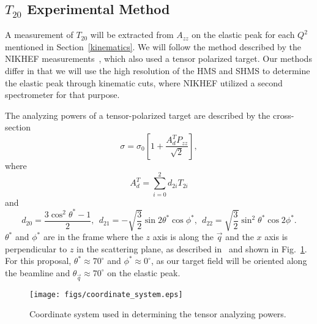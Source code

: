 \subsection{$T_{20}$ Experimental Method} %
\label{t20_exp}

A measurement of $T_{20}$ will be extracted from $A_{zz}$ on the elastic peak for each $Q^2$ mentioned in Section~\ref{kinematics}. We will follow the method described by the NIKHEF measurements~\cite{Bouwhuis:1998re}, which also used a tensor polarized target. Our methods differ in that we will use the high resolution of the HMS and SHMS to determine the elastic peak through kinematic cuts, where NIKHEF utilized a second spectrometer for that purpose. 

The analyzing powers of a tensor-polarized target are described by the cross-section
\begin{equation}
\sigma = \sigma_0\left[ 1 + \frac{A_d^T P_{zz}}{\sqrt{2}} \right],
\label{cs-ana}
\end{equation}
where
\begin{equation} A^T_d = \sum_{i=0}^{2}d_{2i}T_{2i}
\end{equation}
and
\begin{equation} d_{20} = \frac{3 \cos^2 \theta^* -1}{2},~~d_{21} = -\sqrt{\frac{3}{2}}\sin2\theta^*\cos\phi^*,~~d_{22}=\sqrt{\frac{3}{2}}\sin^2\theta^*\cos 2\phi^*.
\end{equation}
$\theta^*$ and $\phi^*$ are in the frame where the $z$ axis is along the $\vec{q}$ and the $x$ axis is perpendicular to $z$ in the scattering plane, as described in~\cite{Donnelly:1985ry} and shown in Fig.~\ref{coords}. For this proposal, $\theta^* \approx 70^{\circ}$ and $\phi^* \approx 0^{\circ}$, as our target field will be oriented along the beamline and $\theta_{\vec{q}}\approx 70^{\circ}$ on the elastic peak.

\begin{figure}
\begin{center}
\texttt{[image: figs/coordinate\_system.eps]} 
\caption{\label{coords}Coordinate system used in determining the tensor analyzing powers.
}
\end{center}
\end{figure}


